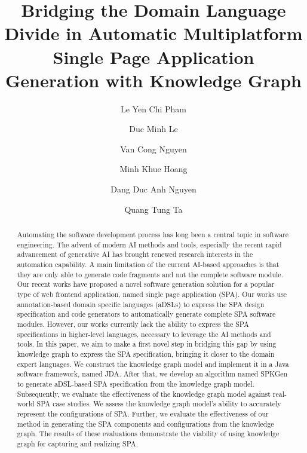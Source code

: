 \documentclass[runningheads]{llncs}
\begin{document}
\title{Bridging the Domain Language Divide in Automatic Multiplatform Single Page Application Generation with Knowledge Graph}
%
%
\author{
Le Yen Chi Pham  \and 
Duc Minh Le  \and
Van Cong Nguyen  \and
Minh Khue Hoang  \and 
Dang Duc Anh Nguyen  \and 
Quang Tung Ta
}

%
%
\maketitle              %
%
\begin{abstract}
Automating the software development process has long been a central topic in software engineering. The advent of modern AI methods and tools, especially the recent rapid advancement of generative AI has brought renewed research interests in the automation capability. A main limitation of the current AI-based approaches is that they are only able to generate code fragments and not the complete software module. Our recent works have proposed a novel software generation solution for a popular type of web frontend application, named single page application (SPA). Our works use annotation-based domain specific languages (aDSLs) to express the SPA design specification and code generators to automatically generate complete SPA software modules. However, our works currently lack the ability to express the SPA specifications in higher-level languages, necessary to leverage the AI methods and tools. In this paper, we aim to make a first novel step in bridging this gap by using knowledge graph to express the SPA specification, bringing it closer to the domain expert languages. We construct the knowledge graph model and implement it in a Java software framework, named JDA. After that, we develop an algorithm named SPKGen to generate aDSL-based SPA specification from the knowledge graph model. Subsequently, we evaluate the effectiveness of the knowledge graph model against real-world SPA case studies. We assess the knowledge graph model's ability to accurately represent the configurations of SPA. Further, we evaluate the effectiveness of our method in generating the SPA components and configurations from the knowledge graph. The results of these evaluations demonstrate the viability of using knowledge graph for capturing and realizing SPA.


\end{abstract}
%
%
%
\end{document}

